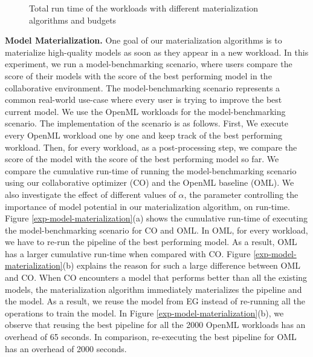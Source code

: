 \begin{figure}
\centering
 \resizebox{0.7\columnwidth}{!}{%
%
}
\caption{Total run time of the workloads with different materialization algorithms and budgets}
\label{run-time-vs-mat}
\end{figure}

\textbf{Model Materialization. }
One goal of our materialization algorithms is to materialize high-quality models as soon as they appear in a new workload.
In this experiment, we run a model-benchmarking scenario, where users compare the score of their models with the score of the best performing model in the collaborative environment.
The model-benchmarking scenario represents a common real-world use-case where every user is trying to improve the best current model.
We use the OpenML workloads for the model-benchmarking scenario.
The implementation of the scenario is as follows.
First, We execute every OpenML workload one by one and keep track of the best performing workload.
Then, for every workload, as a post-processing step, we compare the score of the model with the score of the best performing model so far.
We compare the cumulative run-time of running the model-benchmarking scenario using our collaborative optimizer (CO) and the OpenML baseline (OML).
We also investigate the effect of different values of $\alpha$, the parameter controlling the importance of model potential in our materialization algorithm, on run-time.
Figure \ref{exp-model-materialization}(a) shows the cumulative run-time of executing the model-benchmarking scenario for CO and OML.
In OML, for every workload, we have to re-run the pipeline of the best performing model.
As a result, OML has a larger cumulative run-time when compared with CO.
Figure \ref{exp-model-materialization}(b) explains the reason for such a large difference between OML and CO.
When CO encounters a model that performs better than all the existing models, the materialization algorithm immediately materializes the pipeline and the model.
As a result, we reuse the model from EG instead of re-running all the operations to train the model.
In Figure \ref{exp-model-materialization}(b), we observe that reusing the best pipeline for all the 2000 OpenML workloads has an overhead of 65 seconds.
In comparison, re-executing the best pipeline for OML has an overhead of 2000 seconds.

